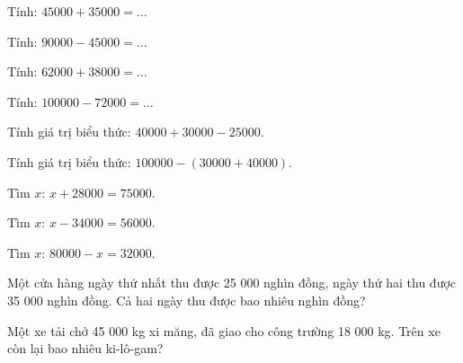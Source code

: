 \begin{ex}
Tính: $45000 + 35000 = \dots$
\end{ex}

\begin{ex}
Tính: $90000 - 45000 = \dots$
\end{ex}

\begin{ex}
Tính: $62000 + 38000 = \dots$
\end{ex}

\begin{ex}
Tính: $100000 - 72000 = \dots$
\end{ex}

\begin{ex}
Tính giá trị biểu thức: $40000 + 30000 - 25000$.
\end{ex}

\begin{ex}
Tính giá trị biểu thức: $100000 - (30000 + 40000)$.
\end{ex}

\begin{ex}
Tìm $x$: $x + 28000 = 75000$.
\end{ex}

\begin{ex}
Tìm $x$: $x - 34000 = 56000$.
\end{ex}

\begin{ex}
Tìm $x$: $80000 - x = 32000$.
\end{ex}

\begin{ex}
Một cửa hàng ngày thứ nhất thu được 25 000 nghìn đồng, ngày thứ hai thu được 35 000 nghìn đồng. Cả hai ngày thu được bao nhiêu nghìn đồng?
\end{ex}

\begin{ex}
Một xe tải chở 45 000 kg xi măng, đã giao cho công trường 18 000 kg. Trên xe còn lại bao nhiêu ki-lô-gam?
\end{ex}

